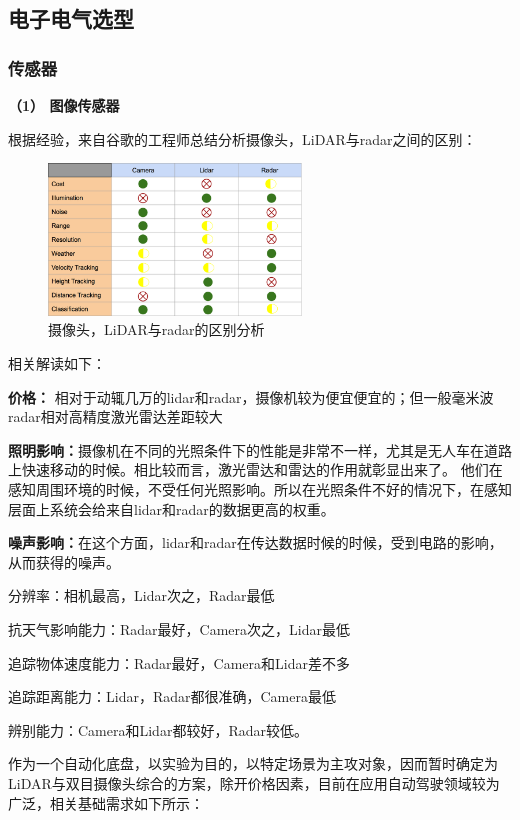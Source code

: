 \subsection{电子电气选型}

\subsubsection{传感器}


\textbf{（1） 图像传感器}

根据经验，来自谷歌的工程师总结分析摄像头，LiDAR与radar之间的区别：

\begin{figure}[H]
	\centering
	\includegraphics[width = 0.6\textwidth]{fig/shijueyj.png}
	\caption{摄像头，LiDAR与radar的区别分析}
	\label{shijueyj}
\end{figure}

相关解读如下：

\textbf{价格：} 相对于动辄几万的lidar和radar，摄像机较为便宜便宜的；但一般毫米波radar相对高精度激光雷达差距较大

\textbf{照明影响：}摄像机在不同的光照条件下的性能是非常不一样，尤其是无人车在道路上快速移动的时候。相比较而言，激光雷达和雷达的作用就彰显出来了。 他们在感知周围环境的时候，不受任何光照影响。所以在光照条件不好的情况下，在感知层面上系统会给来自lidar和radar的数据更高的权重。

\textbf{噪声影响：}在这个方面，lidar和radar在传达数据时候的时候，受到电路的影响，从而获得的噪声。

分辨率：相机最高，Lidar次之，Radar最低

抗天气影响能力：Radar最好，Camera次之，Lidar最低

追踪物体速度能力：Radar最好，Camera和Lidar差不多

追踪距离能力：Lidar，Radar都很准确，Camera最低

辨别能力：Camera和Lidar都较好，Radar较低。

作为一个自动化底盘，以实验为目的，以特定场景为主攻对象，因而暂时确定为LiDAR与双目摄像头综合的方案，除开价格因素，目前在应用自动驾驶领域较为广泛，相关基础需求如下所示：

